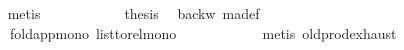 \begin{isabellebody}
\ \ \ \ \ \ \ \ \ \ \isamarkupfalse%
\ metis\isanewline
\ \ \ \ \ \ \ \ \isamarkupfalse%
\ \isamarkupfalse%
\ {\isacharquery}{\kern0pt}thesis\ \isamarkupfalse%
\ backw\ ma{\isacharunderscore}{\kern0pt}def\ \ \isamarkupfalse%
\isanewline
\ \ \ \ \ \ \ \ \ \ \ \ fold{\isacharunderscore}{\kern0pt}app{\isacharunderscore}{\kern0pt}mono\ list{\isacharunderscore}{\kern0pt}to{\isacharunderscore}{\kern0pt}rel{\isacharunderscore}{\kern0pt}mono{}\isanewline
\ \ \ \ \ \ \ \ \ \ \isamarkupfalse%
\ {\isacharparenleft}{\kern0pt}metis\ old{\isachardot}{\kern0pt}prod{\isachardot}{\kern0pt}exhaust{\isacharparenright}{\kern0pt}\isanewline
\ \ \ \ \ \ \isamarkupfalse%
\isanewline
\ \ \ \ \isamarkupfalse%
\isanewline
\ \ \isamarkupfalse%
\isanewline
{}\isamarkupfalse%
%
\endisatagproof
{\isafoldproof}%
%
\isadelimproof
\isanewline
%
\endisadelimproof
\isanewline
\isanewline
\isanewline
\isanewline
%
\isadelimtheory
\isanewline
%
\endisadelimtheory
%
\isatagtheory
{}\isamarkupfalse%
%
\endisatagtheory
{\isafoldtheory}%
%
\isadelimtheory
%
\endisadelimtheory
%
\end{isabellebody}%
\endinput
